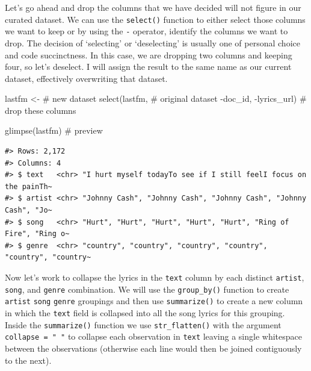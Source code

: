 \documentclass[
  letterpaper,
]{latex/krantz}
\newenvironment{Shaded}{\begin{snugshade}}{\end{snugshade}}
\newcommand{\CommentTok}[1]{\textcolor[rgb]{0.37,0.37,0.37}{#1}}
\newcommand{\FunctionTok}[1]{\textcolor[rgb]{0.28,0.35,0.67}{#1}}
\newcommand{\NormalTok}[1]{\textcolor[rgb]{0.00,0.23,0.31}{#1}}
\newcommand{\OtherTok}[1]{\textcolor[rgb]{0.00,0.23,0.31}{#1}}
\newcommand{\SpecialCharTok}[1]{\textcolor[rgb]{0.37,0.37,0.37}{#1}}
\begin{document}
Let's go ahead and drop the columns that we have decided will not figure
in our curated dataset. We can use the \texttt{select()} function to
either select those columns we want to keep or by using the \texttt{-}
operator, identify the columns we want to drop. The decision of
`selecting' or `deselecting' is usually one of personal choice and code
succinctness. In this case, we are dropping two columns and keeping
four, so let's deselect. I will assign the result to the same name as
our current dataset, effectively overwriting that dataset.

\begin{Shaded}
\begin{Highlighting}[]
\NormalTok{lastfm }\OtherTok{\textless{}{-}} \CommentTok{\# new dataset}
  \FunctionTok{select}\NormalTok{(lastfm, }\CommentTok{\# original dataset}
         \SpecialCharTok{{-}}\NormalTok{doc\_id, }\SpecialCharTok{{-}}\NormalTok{lyrics\_url) }\CommentTok{\# drop these columns}

\FunctionTok{glimpse}\NormalTok{(lastfm) }\CommentTok{\# preview}
\end{Highlighting}
\end{Shaded}

\begin{verbatim}
#> Rows: 2,172
#> Columns: 4
#> $ text   <chr> "I hurt myself todayTo see if I still feelI focus on the painTh~
#> $ artist <chr> "Johnny Cash", "Johnny Cash", "Johnny Cash", "Johnny Cash", "Jo~
#> $ song   <chr> "Hurt", "Hurt", "Hurt", "Hurt", "Hurt", "Ring of Fire", "Ring o~
#> $ genre  <chr> "country", "country", "country", "country", "country", "country~
\end{verbatim}

Now let's work to collapse the lyrics in the \texttt{text} column by
each distinct \texttt{artist}, \texttt{song}, and \texttt{genre}
combination. We will use the \texttt{group\_by()} function to create
\texttt{artist} \texttt{song} \texttt{genre} groupings and then use
\texttt{summarize()} to create a new column in which the \texttt{text}
field is collapsed into all the song lyrics for this grouping. Inside
the \texttt{summarize()} function we use \texttt{str\_flatten()} with
the argument \texttt{collapse\ =\ "\ "} to collapse each observation in
\texttt{text} leaving a single whitespace between the observations
(otherwise each line would then be joined contiguously to the next).
\end{document}

